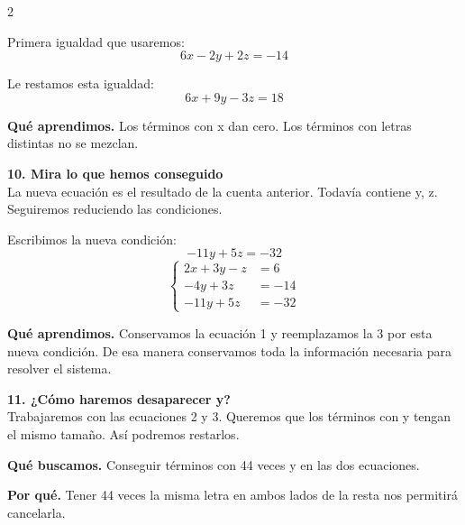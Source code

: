 \documentclass[11pt,a4paper,landscape]{article}
\begin{document}
\begin{multicols*}{2}
\begin{minipage}{\linewidth}
\par\smallskip Primera igualdad que usaremos:
\[6x - 2y + 2z = -14\]
\par\smallskip Le restamos esta igualdad:
\[6x + 9y - 3z = 18\]
\par\smallskip\textbf{Qué aprendimos.} Los términos con x dan cero. Los términos con letras distintas no se mezclan.
\end{minipage}\par\medskip
\noindent\begin{minipage}{\linewidth}\textbf{10. Mira lo que hemos conseguido}\\[2pt]La nueva ecuación es el resultado de la cuenta anterior. Todavía contiene y, z. Seguiremos reduciendo las condiciones.
\par\smallskip Escribimos la nueva condición:
\[-11y + 5z = -32\]
\[\left\{\begin{aligned}2x + 3y - z &= 6\\-4y + 3z &= -14\\-11y + 5z &= -32\end{aligned}\right.\]
\par\smallskip\textbf{Qué aprendimos.} Conservamos la ecuación 1 y reemplazamos la 3 por esta nueva condición. De esa manera conservamos toda la información necesaria para resolver el sistema.
\end{minipage}\par\medskip
\noindent\begin{minipage}{\linewidth}\textbf{11. ¿Cómo haremos desaparecer y?}\\[2pt]Trabajaremos con las ecuaciones 2 y 3. Queremos que los términos con y tengan el mismo tamaño. Así podremos restarlos.
\par\smallskip\textbf{Qué buscamos.} Conseguir términos con 44 veces y en las dos ecuaciones.
\par\smallskip\textbf{Por qué.} Tener 44 veces la misma letra en ambos lados de la resta nos permitirá cancelarla.
\par{}\par\smallskip

\end{minipage}
\end{multicols*}
\end{document}
